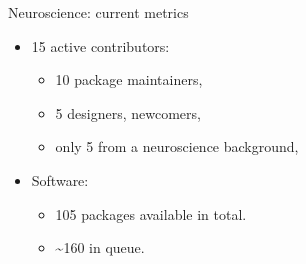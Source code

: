 \begin{frame}[c]{Neuroscience: current metrics}
  \begin{itemize}
    \item \textcolor{FirstGreen}{15 active contributors:}
      \begin{itemize}
        \item 10 package maintainers,
        \item 5 designers, newcomers,
        \item only 5 from a neuroscience background,
      \end{itemize}
      \pause{}
    \item \textcolor{FriendsMagenta}{Software:}
      \begin{itemize}
        \item 105 packages available in total\footnotemark.
        \item \textasciitilde{}160 in queue\footnotemark.
      \end{itemize}
  \end{itemize}
\end{frame}

